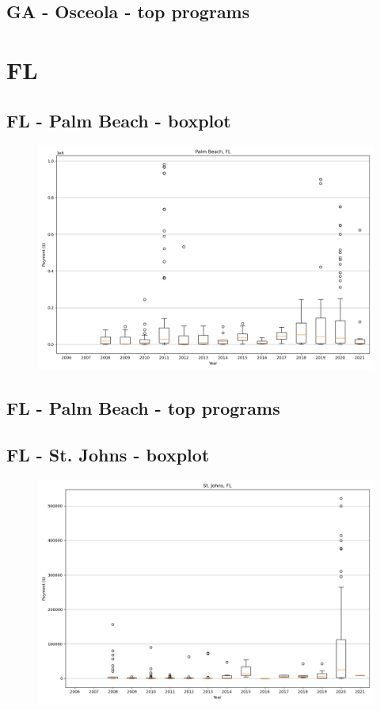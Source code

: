\subsection*{GA - Osceola - top programs}

\newpage
\section*{FL}
\subsection*{FL - Palm Beach - boxplot}
\begin{figure}[h]
\centering
\includegraphics[width=7in]{../output/boxplots/counties/Palm Beach-FL_boxplot.png}
\end{figure}


\subsection*{FL - Palm Beach - top programs}

\newpage
\subsection*{FL - St. Johns - boxplot}
\begin{figure}[h]
\centering
\includegraphics[width=7in]{../output/boxplots/counties/St. Johns-FL_boxplot.png}
\end{figure}


